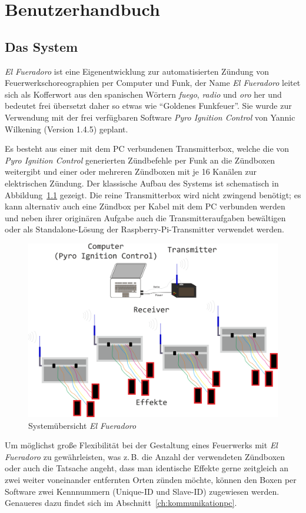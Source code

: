\documentclass[paper=a4, parskip, numbers=noenddot, toc=listof, headsepline]{scrbook}
\newcommand{\pic}{\emph{Pyro Ignition Control}}
\newcommand{\anlage}{\emph{El Fueradoro}}
\begin{document}
	\tableofcontents
\part{Benutzerhandbuch}

	\chapter{Das System}

		\anlage{} ist eine Eigenentwicklung zur automatisierten Zündung von Feuer\-werks\-choreo\-gra\-phien per Computer und Funk, der Name {\anlage} leitet sich als Kofferwort aus den spanischen Wörtern \emph{fuego}, \emph{radio} und \emph{oro} her und bedeutet frei übersetzt daher so etwas wie \enquote{Goldenes Funkfeuer}. Sie wurde zur Verwendung mit der frei verfügbaren Software {\pic} von Yannic Wilkening (Version 1.4.5) geplant.

		Es besteht aus einer mit dem PC verbundenen Transmitterbox, welche die von {\pic} generierten Zündbefehle per Funk an die Zündboxen weitergibt und einer oder mehreren Zündboxen mit je 16 Kanälen zur elektrischen Zündung. Der klassische Aufbau des Systems ist schematisch in Abbildung~\ref{fig:system} gezeigt. Die reine Transmitterbox wird nicht zwingend benötigt; es kann alternativ auch eine Zündbox per Kabel mit dem PC verbunden werden und neben ihrer originären Aufgabe auch die Transmitteraufgaben bewältigen oder als Standalone-Lösung der Raspberry-Pi-Transmitter verwendet werden.

		\begin{figure}
			\centering
			\includegraphics[width=.8\textwidth]{Bilder/system}
			\caption{Systemübersicht \anlage}
			\label{fig:system}
		\end{figure}

		Um möglichst große Flexibilität bei der Gestaltung eines Feuerwerks mit {\anlage} zu gewährleisten, was z.\,B. die Anzahl der verwendeten Zündboxen oder auch die Tatsache angeht, dass man identische Effekte gerne zeitgleich an zwei weiter voneinander entfernten Orten zünden möchte, können den Boxen per Software zwei Kennnummern (Unique-ID und Slave-ID) zugewiesen werden. Genaueres dazu findet sich im Abschnitt~\ref{ch:kommunikationpc}.
\end{document}
